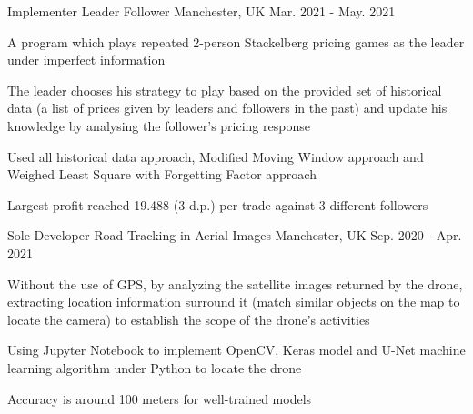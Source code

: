 \begin{cventries}
  \cventry
    {Implementer} %
    {Leader Follower} %
    {Manchester, UK} %
    {Mar. 2021 - May. 2021} %
    {
      \begin{cvitems} %
        \item {A program which plays repeated 2-person Stackelberg pricing games as the leader
               under imperfect information}
        \item {The leader chooses his strategy to play based on the provided set of historical data (a          list of prices given by leaders and followers in the past) and update his knowledge by           analysing the follower's pricing response}
        \item {Used all historical data approach, Modified Moving Window approach and Weighed Least             Square with Forgetting Factor approach}
        \item {Largest profit reached 19.488 (3 d.p.) per trade against 3 different followers}
      \end{cvitems}
    }

  \cventry
    {Sole Developer} %
    {Road Tracking in Aerial Images} %
    {Manchester, UK} %
    {Sep. 2020 - Apr. 2021} %
    {
      \begin{cvitems} %
        \item {Without the use of GPS, by analyzing the satellite images returned by the drone, extracting location information surround it (match similar objects on the map to locate the camera) to establish the scope of the drone's activities}
        \item {Using Jupyter Notebook to implement OpenCV, Keras model and U-Net machine learning algorithm under Python to locate the drone}
        \item {Accuracy is around 100 meters for well-trained models}
      \end{cvitems}
    }


\end{cventries}
